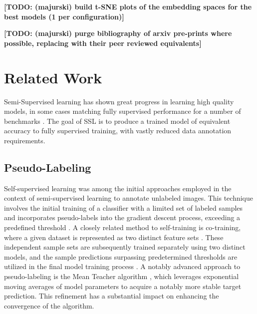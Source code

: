 \documentclass[10pt,twocolumn,letterpaper]{article}
\newcommand{\TODO}[1]{\textbf{\color{red}[TODO: #1]}}
\begin{document}

\TODO {(majurski) build t-SNE plots of the embedding spaces for the best models (1 per configuration)}

\TODO {(majurski) purge bibliography of arxiv pre-prints where possible, replacing with their peer reviewed equivalents}





\section{Related Work}



Semi-Supervised learning has shown great progress in learning high quality models, in some cases matching fully supervised performance for a number of benchmarks \cite{zhang2021flexmatch}.
The goal of SSL is to produce a trained model of equivalent accuracy to fully supervised training, with vastly reduced data annotation requirements.

\subsection{Pseudo-Labeling}
Self-supervised learning was among the initial approaches employed in the context of semi-supervised learning to annotate unlabeled images. 
This technique involves the initial training of a classifier with a limited set of labeled samples and incorporates pseudo-labels into the gradient descent process, exceeding a predefined threshold \cite{yarowsky1995unsupervised, mcclosky2006reranking, olivier2006semi,zhai2019s4l,livieris2019predicting,rosenberg2005semi,menon2020deep,10.1117/12.2549655, app13063752}. 
A closely related method to self-training is co-training, where a given dataset is represented as two distinct feature sets \cite{blum1998combining}. 
These independent sample sets are subsequently trained separately using two distinct models, and the sample predictions surpassing predetermined thresholds are utilized in the final model training process \cite{blum1998combining,prakash2014survey}.
A notably advanced approach to pseudo-labeling is the Mean Teacher algorithm \cite{tarvainen2017mean}, which leverages exponential moving averages of model parameters to acquire a notably more stable target prediction. 
This refinement has a substantial impact on enhancing the convergence of the algorithm.
\end{document}
